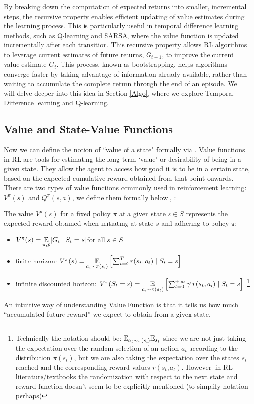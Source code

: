 By breaking down the computation of expected returns into smaller, incremental steps, the recursive property enables efficient updating of value estimates during the learning process. This is particularly useful in temporal difference learning methods, such as Q-learning and SARSA, where the value function is updated incrementally after each transition. This recursive property allows RL algorithms to leverage current estimates of future returns, $G_{t+1}$, to improve the current value estimate $G_t$. This process, known as bootstrapping, helps algorithms converge faster by taking advantage of information already available, rather than waiting to accumulate the complete return through the end of an episode. We will delve deeper into this idea in Section \ref{Algo}, where we explore Temporal Difference learning and Q-learning.

\subsection{Value and State-Value Functions}

Now we can define the notion of ``value of a state" formally via . Value functions in RL are tools for estimating the long-term `value' or desirability of being in a given state. They allow the agent to access how good it is to be in a certain state, based on the expected cumulative reward obtained from that point onwards. There are two types of value functions commonly used in reinforcement learning: $V^{\pi}(s)$ and $Q^{\pi}(s,a)$, we define them formally below \cite{RL}, \cite{mohri2018}:
\begin{definition}
    The value $V^{\pi}(s)$ for a fixed policy $\pi$ at a given state $s \in S$ represents the expected reward obtained when initiating at state $s$ and adhering to policy $\pi:$
    \begin{itemize}
        \item $V^{\pi}(s) = \underset{\pi, p}{\mathbb E} [G_t \mid S_t = s]$for all $s \in S$ \cite{RL}
        \item finite horizon: $V^{\pi}(s) = \underset{a_t \sim \pi(s_t)}{\mathbb E} \left[ \sum_{t=0}^T r(s_t,a_t) \mid S_t =s
        \right]$ \cite{mohri2018}
        \item infinite discounted horizon: $V^{\pi}(S_t = s) = \underset{a_t \sim \pi(s_t)}{\mathbb E} \left[ \sum_{t=0}^{+ \infty} \gamma^t r(s_t,a_t) \mid S_t =s
        \right]$ \cite{mohri2018}     \footnote{Technically the notation should be: $\mathbb E_{a_t \sim \pi(s_t)} \mathbb E_{s_t}$ since
    we are not just taking the expectation over the random selection of an action $a_t$ according to the distribution $\pi(s_t)$, but we are also taking the expectation over the states $s_t$ reached and the corresponding reward values $r(s_t, a_t)$. However, in RL literature/textbooks the randomization with respect to the next state and reward function doesn't seem to be  explicitly mentioned (to simplify notation perhaps)} 
    \end{itemize}
\end{definition}
An intuitive way of understanding Value Function is that it tells us how much ``accumulated future reward'' we expect to obtain from a given state.

